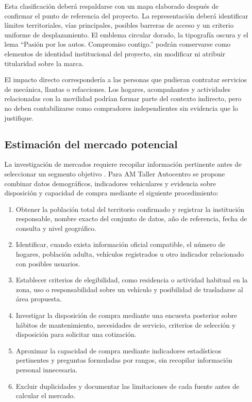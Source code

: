 \documentclass[12pt,letterpaper,oneside]{article}
\begin{document}
Esta clasificación deberá respaldarse con un mapa elaborado después de confirmar el punto de referencia del proyecto. La representación deberá identificar límites territoriales, vías principales, posibles barreras de acceso y un criterio uniforme de desplazamiento. El emblema circular dorado, la tipografía oscura y el lema ``Pasión por los autos. Compromiso contigo.'' podrán conservarse como elementos de identidad institucional del proyecto, sin modificar ni atribuir titularidad sobre la marca.

El impacto directo correspondería a las personas que pudieran contratar servicios de mecánica, llantas o refacciones. Los hogares, acompañantes y actividades relacionadas con la movilidad podrían formar parte del contexto indirecto, pero no deben contabilizarse como compradores independientes sin evidencia que lo justifique.

\subsection{Estimación del mercado potencial}

La investigación de mercados requiere recopilar información pertinente antes de seleccionar un segmento objetivo \autocite{itescaCompetencia2}. Para AM Taller Autocentro se propone combinar datos demográficos, indicadores vehiculares y evidencia sobre disposición y capacidad de compra mediante el siguiente procedimiento:

\begin{enumerate}
    \item Obtener la población total del territorio confirmado y registrar la institución responsable, nombre exacto del conjunto de datos, año de referencia, fecha de consulta y nivel geográfico.
    \item Identificar, cuando exista información oficial compatible, el número de hogares, población adulta, vehículos registrados u otro indicador relacionado con posibles usuarios.
    \item Establecer criterios de elegibilidad, como residencia o actividad habitual en la zona, uso o responsabilidad sobre un vehículo y posibilidad de trasladarse al área propuesta.
    \item Investigar la disposición de compra mediante una encuesta posterior sobre hábitos de mantenimiento, necesidades de servicio, criterios de selección y disposición para solicitar una cotización.
    \item Aproximar la capacidad de compra mediante indicadores estadísticos pertinentes y preguntas formuladas por rangos, sin recopilar información personal innecesaria.
    \item Excluir duplicidades y documentar las limitaciones de cada fuente antes de calcular el mercado.
\end{enumerate}
\end{document}
